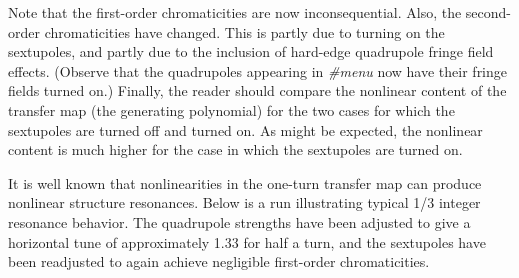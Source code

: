      Note that the first-order chromaticities are now inconsequential.
Also, the second-order chromaticities have changed.  This is partly due to
turning on the sextupoles, and partly due to the inclusion of hard-edge
quadrupole fringe field effects.  (Observe that the quadrupoles appearing
in {\em \#menu} now have their fringe fields turned on.)  Finally, the reader
should compare the nonlinear content of the transfer map (the generating
polynomial) for the two cases for which the sextupoles are turned off and
turned on.  As might be expected, the nonlinear content is much higher for
the case in which the sextupoles are turned on.

     It is well known that nonlinearities in the one-turn transfer map can
produce nonlinear structure resonances.  Below is a \Mary run
illustrating typical 1/3 integer resonance behavior.  The quadrupole
strengths have been adjusted to give a horizontal tune of approximately
1.33 for half a turn, and the sextupoles have been readjusted to again
achieve negligible first-order chromaticities.

